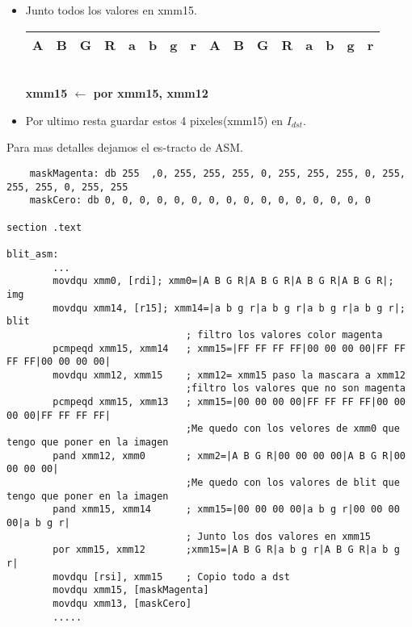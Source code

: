 \begin{itemize}
	\item Junto todos los valores en xmm15.
		\begin{center}
		   \begin{tabular}{| c | c | c | c || c | c | c | c || c | c | c | c || c | c | c | c |}
			 \hline
			 A & B & G & R & a & b & g & r & A & B & G & R & a & b & g & r \\ \hline
		   \end{tabular}
		   \\ \textbf{xmm15 $\gets$ por xmm15, xmm12}
		\end{center}		
	\item Por ultimo resta guardar estos 4 pixeles(xmm15) en $I_{dst}$.

\end{itemize}

Para mas detalles dejamos el es-tracto de ASM.

\begin{codesnippet}
\begin{verbatim}
	maskMagenta: db 255	 ,0, 255, 255, 255, 0, 255, 255, 255, 0, 255, 255, 255, 0, 255, 255
	maskCero: db 0, 0, 0, 0, 0, 0, 0, 0, 0, 0, 0, 0, 0, 0, 0, 0 

section .text

blit_asm:
		...
		movdqu xmm0, [rdi]; xmm0=|A B G R|A B G R|A B G R|A B G R|; img	
		movdqu xmm14, [r15]; xmm14=|a b g r|a b g r|a b g r|a b g r|; blit
							   ; filtro los valores color magenta
		pcmpeqd xmm15, xmm14   ; xmm15=|FF FF FF FF|00 00 00 00|FF FF FF FF|00 00 00 00| 
		movdqu xmm12, xmm15	   ; xmm12= xmm15 paso la mascara a xmm12 
							   ;filtro los valores que no son magenta
		pcmpeqd xmm15, xmm13   ; xmm15=|00 00 00 00|FF FF FF FF|00 00 00 00|FF FF FF FF|
							   ;Me quedo con los velores de xmm0 que tengo que poner en la imagen
		pand xmm12, xmm0       ; xmm2=|A B G R|00 00 00 00|A B G R|00 00 00 00|
							   ;Me quedo con los valores de blit que tengo que poner en la imagen
		pand xmm15, xmm14      ; xmm15=|00 00 00 00|a b g r|00 00 00 00|a b g r|
							   ; Junto los dos valores en xmm15
		por xmm15, xmm12 	   ;xmm15=|A B G R|a b g r|A B G R|a b g r|
		movdqu [rsi], xmm15	   ; Copio todo a dst
		movdqu xmm15, [maskMagenta]
		movdqu xmm13, [maskCero]
		.....
\end{verbatim}
\end{codesnippet}

